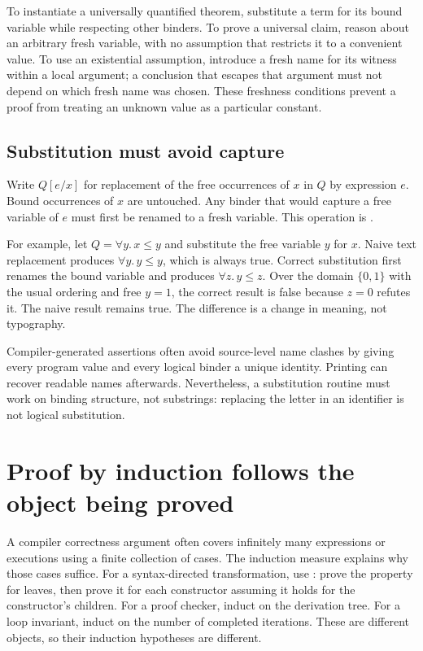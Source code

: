 To instantiate a universally quantified theorem, substitute a term for its bound variable while respecting other binders.
To prove a universal claim, reason about an arbitrary fresh variable, with no assumption that restricts it to a convenient value.
To use an existential assumption, introduce a fresh name for its witness within a local argument; a conclusion that escapes that argument must not depend on which fresh name was chosen.
These freshness conditions prevent a proof from treating an unknown value as a particular constant.

\subsection{Substitution must avoid capture}
\label{sec:ch40-substitution}

Write $Q[e/x]$ for replacement of the free occurrences of $x$ in $Q$ by expression $e$.
Bound occurrences of $x$ are untouched.
Any binder that would capture a free variable of $e$ must first be renamed to a fresh variable.
This operation is .

For example, let $Q=\forall y.\,x\leq y$ and substitute the free variable $y$ for $x$.
Naive text replacement produces $\forall y.\,y\leq y$, which is always true.
Correct substitution first renames the bound variable and produces $\forall z.\,y\leq z$.
Over the domain $\{0,1\}$ with the usual ordering and free $y=1$, the correct result is false because $z=0$ refutes it.
The naive result remains true.
The difference is a change in meaning, not typography.

Compiler-generated assertions often avoid source-level name clashes by giving every program value and every logical binder a unique identity.
Printing can recover readable names afterwards.
Nevertheless, a substitution routine must work on binding structure, not substrings: replacing the letter  in an identifier is not logical substitution.

\section{Proof by induction follows the object being proved}
\label{sec:ch40-induction}

A compiler correctness argument often covers infinitely many expressions or executions using a finite collection of cases.
The induction measure explains why those cases suffice.
For a syntax-directed transformation, use : prove the property for leaves, then prove it for each constructor assuming it holds for the constructor's children.
For a proof checker, induct on the derivation tree.
For a loop invariant, induct on the number of completed iterations.
These are different objects, so their induction hypotheses are different.

